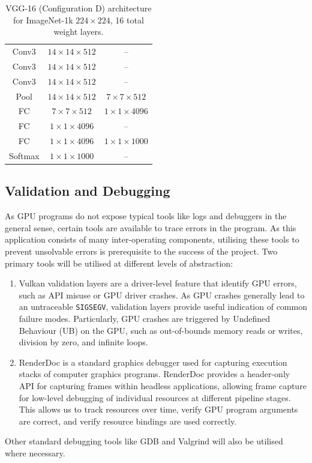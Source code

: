 \documentclass[10pt, a4paper]{article}
\begin{document}
\begin{table}[H]
\begin{tabular}{|c|c|c|}
    Conv3 & $ 14 \times 14 \times 512 $ & -- \\
    Conv3 & $ 14 \times 14 \times 512 $ & -- \\
    Conv3 & $ 14 \times 14 \times 512 $ & -- \\
    Pool & $ 14 \times 14 \times 512 $ & $ 7 \times 7 \times 512 $ \\
    \hline

    FC & $7\times7\times512$ & $1 \times 1 \times 4096$ \\
    FC & $1\times1\times4096$ & -- \\
    FC & $1\times1\times4096$ & $1\times1\times1000$ \\
    \hline
    Softmax & $1\times1\times1000$&--\\
    \hline
\end{tabular}
\caption{VGG-16 (Configuration D) architecture for ImageNet-1k $224 \times 224$, 16 total weight layers.}
\end{table}

\subsection{Validation and Debugging}
As GPU programs do not expose typical tools like logs and debuggers in the general sense, certain tools are available to trace errors in the program. As this application consists of many inter-operating components, utilising these tools to prevent unsolvable errors is prerequisite to the success of the project. Two primary tools will be utilised at different levels of abstraction:
\begin{enumerate}
	\item Vulkan validation layers are a driver-level feature that identify GPU errors, such as API misuse or GPU driver crashes. As GPU crashes generally lead to an untraceable \texttt{SIGSEGV}, validation layers provide useful indication of common failure modes. Particularly, GPU crashes are triggered by Undefined Behaviour (UB) on the GPU, such as out-of-bounds memory reads or writes, division by zero, and infinite loops.
	\item RenderDoc is a standard graphics debugger used for capturing execution stacks of computer graphics programs. RenderDoc provides a header-only API for capturing frames within headless applications, allowing frame capture for low-level debugging of individual resources at different pipeline stages. This allows us to track resources over time, verify GPU program arguments are correct, and verify resource bindings are used correctly.
\end{enumerate}
Other standard debugging tools like GDB and Valgrind will also be utilised where necessary. 
\end{document}
